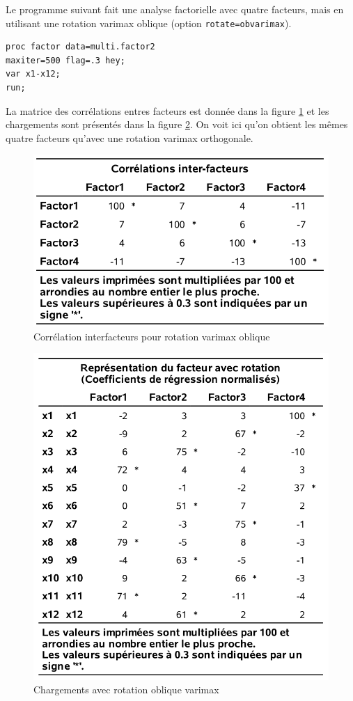 \documentclass[
]{book}
\theoremstyle{definition}
\theoremstyle{definition}
\theoremstyle{definition}
\theoremstyle{remark}
\begin{document}
Le programme suivant fait une analyse factorielle avec quatre facteurs, mais en utilisant une rotation varimax oblique (option \texttt{rotate=obvarimax}).

\begin{verbatim}
proc factor data=multi.factor2
maxiter=500 flag=.3 hey;
var x1-x12;
run;
\end{verbatim}

La matrice des corrélations entres facteurs est donnée dans la figure \ref{fig:fig1p13} et les chargements sont présentés dans la figure \ref{fig:fig1p14}. On voit ici qu'on obtient les mêmes quatre facteurs qu'avec une rotation varimax orthogonale.

\begin{figure}

{\centering \includegraphics[width=0.7\linewidth]{figures/01-facto-e13} 

}

\caption{Corrélation interfacteurs pour rotation varimax oblique}\label{fig:fig1p13}
\end{figure}

\begin{figure}

{\centering \includegraphics[width=0.7\linewidth]{figures/01-facto-e14} 

}

\caption{Chargements avec rotation oblique varimax}\label{fig:fig1p14}
\end{figure}
\end{document}
